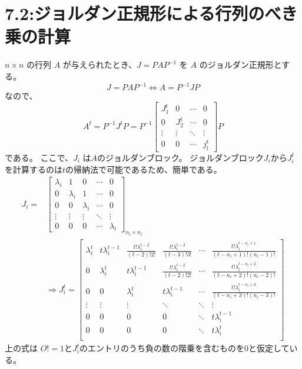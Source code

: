 \documentclass{jsarticle}
\begin{document}

\section*{7.2:ジョルダン正規形による行列のべき乗の計算}

$n\times n$ の行列 $A$ が与えられたとき、$J =PAP^{-1}$ を $A$ のジョルダン正規形とする。
\begin{equation}
  J = PAP^{-1} \Leftrightarrow A = P^{-1}JP
\end{equation}
なので、
\begin{equation}
  A^t = P^{-1}J^tP = P^{-1}
  \begin{bmatrix}
    J^t_1 & 0 & \cdots & 0\\
    0 & J^t_2 & \cdots & 0\\
    \vdots & \vdots & \ddots & \vdots\\
    0 & 0 & \cdots & j^t_l
  \end{bmatrix}P \tag{7.1}
\end{equation}
である。
ここで、$J_i$ は$A$のジョルダンブロック。
ジョルダンブロック$J_i$から$J^t_i$を計算するのは$t$の帰納法で可能であるため、簡単である。
\begin{equation}
  \begin{aligned}
  J_i =& \begin{bmatrix}
    \lambda_i&1 & 0 & \cdots & 0\\
    0 & \lambda_i &1& \cdots & 0\\
    0 &0& \lambda_i & \cdots & 0\\
    \vdots & \vdots& \vdots & \ddots & \vdots\\
    0 & 0 &0& \cdots & \lambda_i
  \end{bmatrix}_{n_i\times n_i}\\
  & \Rightarrow J^t_i = \begin{bmatrix}
    \lambda^t_i & t\lambda^{t-1}_i& \frac{t!\lambda^{t-2}_i}{(t-2)!2!}&\frac{t!\lambda^{t-3}_i}{(t-3)!3!}&\cdots&\frac{t!\lambda^{t-n_i+1}_i}{(t-n_i+1)!(n_i-1)!}\\
    0 & \lambda^t_i & t\lambda^{t-1}_i& \frac{t!\lambda^{t-2}_i}{(t-2)!2!}&\cdots&\frac{t!\lambda^{t-n_i+2}_i}{(t-n_i+2)!(n_i-2)!}\\
    0&0 & \lambda^t_i & t\lambda^{t-1}_i&\cdots&\frac{t!\lambda^{t-n_i+3}_i}{(t-n_i+3)!(n_i-3)!}\\
    \vdots&\vdots&\vdots&\ddots&\ddots &\vdots\\
    0&0&0&0&\ddots&t\lambda^{t-1}_i\\
    0&0&0&0&\ddots&t\lambda^{t}_i\\
  \end{bmatrix}
\end{aligned}\tag{7.2}
\end{equation}
上の式は $O! = 1 $と$J^t_i$のエントリのうち負の数の階乗を含むものを0と仮定している。
\end{document}
